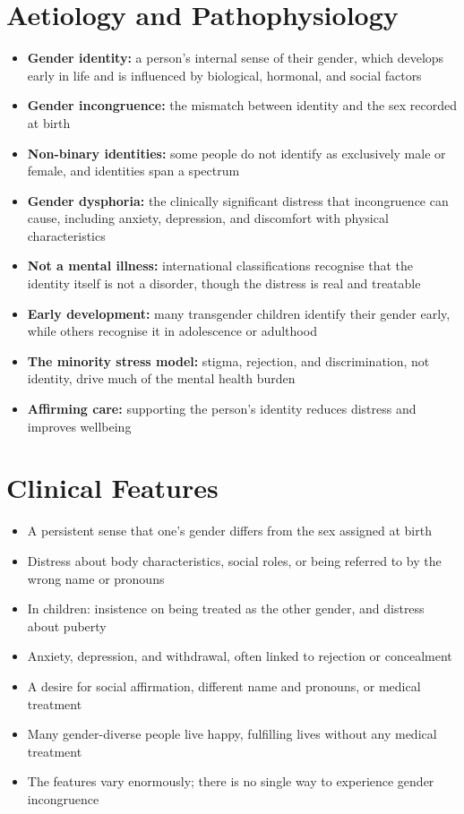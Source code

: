 \section*{Aetiology and Pathophysiology}
\begin{itemize}
    \item \textbf{Gender identity:} a person's internal sense of their gender, which develops early in life and is influenced by biological, hormonal, and social factors
    \item \textbf{Gender incongruence:} the mismatch between identity and the sex recorded at birth
    \item \textbf{Non-binary identities:} some people do not identify as exclusively male or female, and identities span a spectrum
    \item \textbf{Gender dysphoria:} the clinically significant distress that incongruence can cause, including anxiety, depression, and discomfort with physical characteristics
    \item \textbf{Not a mental illness:} international classifications recognise that the identity itself is not a disorder, though the distress is real and treatable
    \item \textbf{Early development:} many transgender children identify their gender early, while others recognise it in adolescence or adulthood
    \item \textbf{The minority stress model:} stigma, rejection, and discrimination, not identity, drive much of the mental health burden
    \item \textbf{Affirming care:} supporting the person's identity reduces distress and improves wellbeing
\end{itemize}

\section*{Clinical Features}
\begin{itemize}
    \item A persistent sense that one's gender differs from the sex assigned at birth
    \item Distress about body characteristics, social roles, or being referred to by the wrong name or pronouns
    \item In children: insistence on being treated as the other gender, and distress about puberty
    \item Anxiety, depression, and withdrawal, often linked to rejection or concealment
    \item A desire for social affirmation, different name and pronouns, or medical treatment
    \item Many gender-diverse people live happy, fulfilling lives without any medical treatment
    \item The features vary enormously; there is no single way to experience gender incongruence
\end{itemize}

